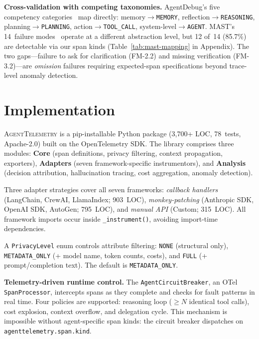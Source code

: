 \documentclass{article}
\begin{document}
\textbf{Cross-validation with competing taxonomies.}
AgentDebug's five competency categories~\citep{agentdebug} map directly:
memory$\to$\texttt{MEMORY}, reflection$\to$\texttt{REASONING},
planning$\to$\texttt{PLANNING}, action$\to$\texttt{TOOL\_CALL},
system-level$\to$\texttt{AGENT}.
MAST's 14~failure modes~\citep{mast} operate at a different
abstraction level, but 12 of~14 (85.7\%) are detectable via our span
kinds (Table~\ref{tab:mast-mapping} in Appendix).  The two
gaps---failure to ask for clarification (FM-2.2) and missing
verification (FM-3.2)---are \emph{omission} failures requiring
expected-span specifications beyond trace-level anomaly detection.

\section{Implementation}
\label{sec:implementation}

\textsc{AgentTelemetry} is a pip-installable Python package (3,700+
LOC, 78~tests, Apache-2.0) built on the OpenTelemetry SDK.  The
library comprises three modules: \textbf{Core} (span definitions,
privacy filtering, context propagation, exporters),
\textbf{Adapters} (seven framework-specific instrumentors), and
\textbf{Analysis} (decision attribution, hallucination tracing, cost
aggregation, anomaly detection).

Three adapter strategies cover all seven frameworks:
\emph{callback handlers} (LangChain, CrewAI, LlamaIndex; 903~LOC),
\emph{monkey-patching} (Anthropic SDK, OpenAI SDK, AutoGen; 795~LOC),
and \emph{manual API} (Custom; 315~LOC).  All framework imports occur
inside \texttt{\_instrument()}, avoiding import-time dependencies.

A \texttt{PrivacyLevel} enum controls attribute filtering:
\texttt{NONE} (structural only), \texttt{METADATA\_ONLY} (+ model
name, token counts, costs), and \texttt{FULL} (+ prompt/completion
text).  The default is \texttt{METADATA\_ONLY}.

\textbf{Telemetry-driven runtime control.}
The \texttt{AgentCircuitBreaker}, an OTel \texttt{SpanProcessor},
intercepts spans as they complete and checks for fault patterns in
real time.  Four policies are supported: reasoning loop ($\geq N$
identical tool calls), cost explosion, context overflow, and
delegation cycle.  This mechanism is impossible without agent-specific
span kinds: the circuit breaker dispatches on
\texttt{agenttelemetry.span.kind}.
\end{document}
